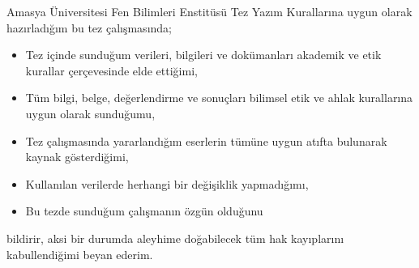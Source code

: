 \documentclass[
oneside, %
doktora, %
]{aufbetez} %
\begin{document}
\shorthandoff{=}%


\frontmatter%






\ickapak%
\tezkabulonaysayfasi%
\ithafsayfasi%







\begin{etikbeyan}
	Amasya Üniversitesi Fen Bilimleri Enstitüsü Tez Yazım Kurallarına uygun olarak hazırladığım bu tez çalışmasında;
	\begin{itemize}
		\item Tez içinde sunduğum verileri, bilgileri ve dokümanları akademik ve etik kurallar çer\-çe\-ve\-sin\-de elde ettiğimi,
		\item Tüm bilgi, belge, değerlendirme ve sonuçları bilimsel etik ve ahlak kurallarına uygun olarak sunduğumu,
		\item Tez çalışmasında yararlandığım eserlerin tümüne uygun atıfta bulunarak kaynak gös\-ter\-diği\-mi,
		\item Kullanılan verilerde herhangi bir değişiklik yapmadığımı,
		\item Bu tezde sunduğum çalışmanın özgün olduğunu
	\end{itemize}
	bildirir, aksi bir durumda aleyhime doğabilecek tüm hak kayıplarını kabullendiğimi beyan ederim.
\end{etikbeyan}








\begin{ozet}
	\lipsum[1-2]
\end{ozet}
\end{document}
